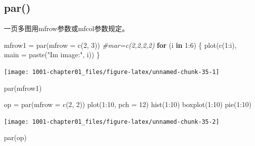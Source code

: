\documentclass[
]{book}
\newenvironment{Shaded}{\begin{snugshade}}{\end{snugshade}}
\newcommand{\AttributeTok}[1]{\textcolor[rgb]{0.77,0.63,0.00}{#1}}
\newcommand{\CommentTok}[1]{\textcolor[rgb]{0.56,0.35,0.01}{\textit{#1}}}
\newcommand{\ControlFlowTok}[1]{\textcolor[rgb]{0.13,0.29,0.53}{\textbf{#1}}}
\newcommand{\DecValTok}[1]{\textcolor[rgb]{0.00,0.00,0.81}{#1}}
\newcommand{\FunctionTok}[1]{\textcolor[rgb]{0.00,0.00,0.00}{#1}}
\newcommand{\NormalTok}[1]{#1}
\newcommand{\OtherTok}[1]{\textcolor[rgb]{0.56,0.35,0.01}{#1}}
\newcommand{\SpecialCharTok}[1]{\textcolor[rgb]{0.00,0.00,0.00}{#1}}
\newcommand{\StringTok}[1]{\textcolor[rgb]{0.31,0.60,0.02}{#1}}
\begin{document}
\hypertarget{par}{%
\subsection{par()}\label{par}}

一页多图用mfrow参数或mfcol参数规定。

\begin{Shaded}
\begin{Highlighting}[]
\NormalTok{mfrow1 }\OtherTok{=} \FunctionTok{par}\NormalTok{(}\AttributeTok{mfrow =} \FunctionTok{c}\NormalTok{(}\DecValTok{2}\NormalTok{, }\DecValTok{3}\NormalTok{))  }\CommentTok{\#mar=c(2,2,2,2)}
\ControlFlowTok{for}\NormalTok{ (i }\ControlFlowTok{in} \DecValTok{1}\SpecialCharTok{:}\DecValTok{6}\NormalTok{) \{}
    \FunctionTok{plot}\NormalTok{(}\FunctionTok{c}\NormalTok{(}\DecValTok{1}\SpecialCharTok{:}\NormalTok{i), }\AttributeTok{main =} \FunctionTok{paste}\NormalTok{(}\StringTok{"I\textquotesingle{}m image:"}\NormalTok{, i))}
\NormalTok{\}}
\end{Highlighting}
\end{Shaded}

\begin{center}\texttt{[image: 1001-chapter01\_files/figure-latex/unnamed-chunk-35-1]} \end{center}

\begin{Shaded}
\begin{Highlighting}[]
\FunctionTok{par}\NormalTok{(mfrow1)}

\NormalTok{op }\OtherTok{=} \FunctionTok{par}\NormalTok{(}\AttributeTok{mfrow =} \FunctionTok{c}\NormalTok{(}\DecValTok{2}\NormalTok{, }\DecValTok{2}\NormalTok{))}
\FunctionTok{plot}\NormalTok{(}\DecValTok{1}\SpecialCharTok{:}\DecValTok{10}\NormalTok{, }\AttributeTok{pch =} \DecValTok{12}\NormalTok{)}
\FunctionTok{hist}\NormalTok{(}\DecValTok{1}\SpecialCharTok{:}\DecValTok{10}\NormalTok{)}
\FunctionTok{boxplot}\NormalTok{(}\DecValTok{1}\SpecialCharTok{:}\DecValTok{10}\NormalTok{)}
\FunctionTok{pie}\NormalTok{(}\DecValTok{1}\SpecialCharTok{:}\DecValTok{10}\NormalTok{)}
\end{Highlighting}
\end{Shaded}

\begin{center}\texttt{[image: 1001-chapter01\_files/figure-latex/unnamed-chunk-35-2]} \end{center}

\begin{Shaded}
\begin{Highlighting}[]
\FunctionTok{par}\NormalTok{(op)}
\end{Highlighting}
\end{Shaded}
\end{document}
